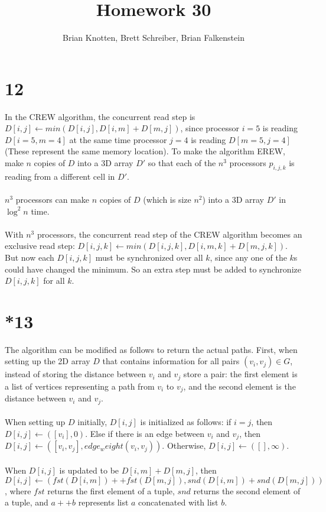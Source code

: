 \documentclass[letterpaper,notitlepage,twoside]{article}
\begin{document}
\title{Homework 30}
\author{Brian Knotten, Brett Schreiber, Brian Falkenstein}
\maketitle

\section*{12}
In the CREW algorithm, the concurrent read step is $D[i,j] \gets min(D[i, j], D[i, m] + D[m, j])$, since processor $i = 5$ is reading $D[i = 5, m = 4]$ at the same time processor $j = 4$ is reading $D[m = 5, j = 4]$ (These represent the same memory location). To make the algorithm EREW, make $n$ copies of $D$ into a 3D array $D'$ so that each of the $n^3$ processors $p_{i, j, k}$ is reading from a different cell in $D'$.
\\\\
$n^3$ processors can make $n$ copies of $D$ (which is size $n^2$) into a 3D array $D'$ in $\log^2 n$ time.
\\\\
With $n^3$ processors, the concurrent read step of the CREW algorithm becomes an exclusive read step: $D[i, j, k] \gets min(D[i, j, k], D[i, m, k] + D[m, j, k])$. But now each $D[i, j, k]$ must be synchronized over all $k$, since any one of the $k$s could have changed the minimum. So an extra step must be added to synchronize $D[i, j, k]$ for all $k$.

\section{*13}
The algorithm can be modified as follows to return the actual paths. First, when setting up the 2D array $D$ that contains information for all pairs $(v_i, v_j) \in G$, instead of storing the distance between $v_i$ and $v_j$ store a pair: the first element is a list of vertices representing a path from $v_i$ to $v_j$, and the second element is the distance between $v_i$ and $v_j$.
\\\\
When setting up $D$ initially, $D[i, j]$ is initialized as follows: if $i = j$, then $D[i, j] \gets ([v_i], 0)$. Else if there is an edge between $v_i$ and $v_j$, then $D[i, j] \gets ([v_i, v_j], edge_weight(v_i, v_j))$. Otherwise, $D[i, j] \gets ([], \infty)$.
\\\\
When $D[i, j]$ is updated to be $D[i, m] + D[m, j]$, then $D[i, j] \gets (fst(D[i, m]) ++ fst(D[m, j]), snd(D[i, m]) + snd(D[m, j]))$, where $fst$ returns the first element of a tuple, $snd$ returns the second element of a tuple, and $a ++ b$ represents list $a$ concatenated with list $b$.
\end{document}
